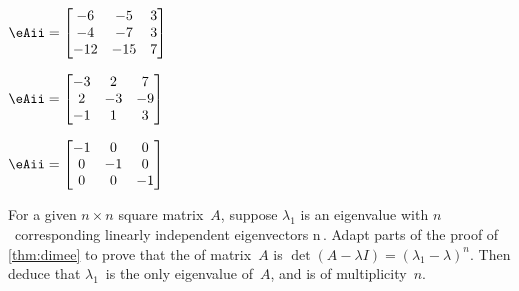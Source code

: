 \begin{exercise}
\begin{parts}
\item \(\eAii=\begin{bmatrix} -6 & -5 & 3
\\-4 & -7 & 3
\\-12 & -15 & 7 \end{bmatrix}\)

\item \(\eAii=\begin{bmatrix} -3 & 2 & 7
\\2 & -3 & -9
\\-1 & 1 & 3 \end{bmatrix}\)

\item \(\eAii=\begin{bmatrix} -1 & 0 & 0
\\0 & -1 & 0
\\0 & 0 & -1 \end{bmatrix}\)


\end{parts}
\end{exercise}







\begin{exercise} \label{ex:dimme} 
For a given \(n\times n\) square matrix~\(A\), suppose \(\lambda_1\) is an eigenvalue with \(n\)~corresponding linearly independent eigenvectors \hlist\pv n\,.  
Adapt parts of the proof of \autoref{thm:dimee} to prove that the  of matrix~\(A\) is \(\det(A-\lambda I)=(\lambda_1-\lambda)^n\). 
Then deduce that \(\lambda_1\)~is the only eigenvalue of~\(A\), and is of multiplicity~\(n\).
\end{exercise}




